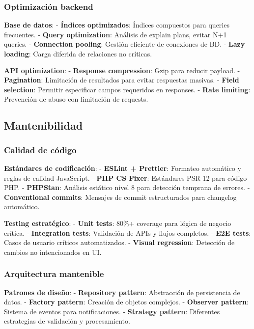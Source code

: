 \documentclass[12pt,a4paper,oneside]{report}
\begin{document}
\subsubsection{Optimización backend}\label{optimizaciuxf3n-backend}

\textbf{Base de datos}: - \textbf{Índices optimizados}: Índices
compuestos para queries frecuentes. - \textbf{Query optimization}:
Análisis de explain plans, evitar N+1 queries. - \textbf{Connection
pooling}: Gestión eficiente de conexiones de BD. - \textbf{Lazy
loading}: Carga diferida de relaciones no críticas.

\textbf{API optimization}: - \textbf{Response compression}: Gzip para
reducir payload. - \textbf{Pagination}: Limitación de resultados para
evitar respuestas masivas. - \textbf{Field selection}: Permitir
especificar campos requeridos en responses. - \textbf{Rate limiting}:
Prevención de abuso con limitación de requests.

\subsection{Mantenibilidad}\label{mantenibilidad-1}

\subsubsection{Calidad de código}\label{calidad-de-cuxf3digo}

\textbf{Estándares de codificación}: - \textbf{ESLint + Prettier}:
Formateo automático y reglas de calidad JavaScript. - \textbf{PHP CS
Fixer}: Estándares PSR-12 para código PHP. - \textbf{PHPStan}: Análisis
estático nivel 8 para detección temprana de errores. -
\textbf{Conventional commits}: Mensajes de commit estructurados para
changelog automático.

\textbf{Testing estratégico}: - \textbf{Unit tests}: 80\%+ coverage para
lógica de negocio crítica. - \textbf{Integration tests}: Validación de
APIs y flujos completos. - \textbf{E2E tests}: Casos de usuario críticos
automatizados. - \textbf{Visual regression}: Detección de cambios no
intencionados en UI.

\subsubsection{Arquitectura mantenible}\label{arquitectura-mantenible}

\textbf{Patrones de diseño}: - \textbf{Repository pattern}: Abstracción
de persistencia de datos. - \textbf{Factory pattern}: Creación de
objetos complejos. - \textbf{Observer pattern}: Sistema de eventos para
notificaciones. - \textbf{Strategy pattern}: Diferentes estrategias de
validación y procesamiento.
\end{document}
